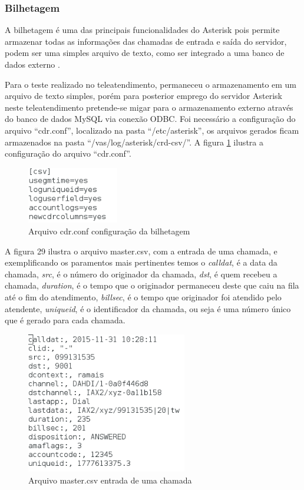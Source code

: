 \subsubsection{Bilhetagem}
A bilhetagem é uma das principais funcionalidades do Asterisk pois permite armazenar todas as informações das chamadas de entrada e saída do servidor, podem ser uma simples arquivo de texto, como ser integrado a uma banco de dados externo \cite{flavioeduardoandredade2005}.

Para o teste realizado no teleatendimento, permaneceu o armazenamento em um arquivo de texto simples, porém para posterior emprego do servidor Asterisk neste teleatendimento pretende-se migar para o armazenamento externo através do banco de dados MySQL via conexão ODBC. Foi necessário a configuração do arquivo ``cdr.conf'', localizado na pasta ``/etc/asterisk'', os arquivos gerados ficam armazenados na pasta ``/vas/log/asterisk/crd-csv/''. A figura \ref{Figura28} ilustra a configuração do arquivo ``cdr.conf''.

\begin{figure}[h]
	\centering
	\includegraphics[width=4cm]{imagens/cdr.png}
	\caption{Arquivo cdr.conf configuração da bilhetagem}
    \label{Figura28}
\end{figure}

A figura 29 ilustra o arquivo master.csv, com a entrada de uma chamada, e exemplificando os paramentos mais pertinentes temos o \textit{calldat}, é a data da chamada, \textit{src}, é o número do originador da chamada, \textit{dst}, é quem recebeu a chamada, \textit{duration}, é o tempo que o originador permaneceu deste que caiu na fila até o fim do atendimento, \textit{billsec}, é o tempo que originador foi atendido pelo atendente, \textit{uniqueid}, é o identificador da chamada, ou seja é uma número único que é gerado para cada chamada.

\begin{figure}[h]
	\centering
	\includegraphics[width=7cm]{imagens/master.png}
	\caption{Arquivo master.csv entrada de uma chamada}
    \label{Figura29}
\end{figure}

